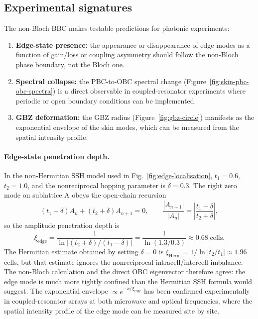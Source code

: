 \subsection{Experimental signatures}
\label{ssec:experimental-signatures}

The non-Bloch BBC makes testable predictions for photonic experiments:
\begin{enumerate}
 \item \textbf{Edge-state presence:} the appearance or disappearance
 of edge modes as a function of gain/loss or coupling asymmetry
 should follow the non-Bloch phase boundary, not the Bloch one.
 \item \textbf{Spectral collapse:} the PBC-to-OBC spectral change
 (Figure~\ref{fig:skin-pbc-obc-spectra}) is a direct observable
 in coupled-resonator experiments where periodic or open boundary
 conditions can be implemented.
 \item \textbf{GBZ deformation:} the GBZ radius
 (Figure~\ref{fig:gbz-circle}) manifests as the exponential
 envelope of the skin modes, which can be measured from the
 spatial intensity profile.
\end{enumerate}

\paragraph{Edge-state penetration depth.}
In the non-Hermitian SSH model used in Fig.~\ref{fig:edge-localisation},
$t_1 = 0.6$, $t_2 = 1.0$, and the nonreciprocal hopping parameter is
$\delta = 0.3$.  The right zero mode on sublattice A obeys the open-chain
recursion
\begin{equation}
  (t_1-\delta)A_n + (t_2+\delta)A_{n+1}=0,
  \qquad
  \frac{|A_{n+1}|}{|A_n|}=\left|\frac{t_1-\delta}{t_2+\delta}\right|,
  \label{eq:edge-recursion}
\end{equation}
so the amplitude penetration depth is
\begin{equation}
  \xi_{\mathrm{edge}}
  = \frac{1}{\ln\left|(t_2+\delta)/(t_1-\delta)\right|}
  = \frac{1}{\ln(1.3/0.3)}
  \approx 0.68\;\text{cells}.
  \label{eq:edge-penetration}
\end{equation}
The Hermitian estimate obtained by setting $\delta=0$ is
$\xi_{\mathrm{Herm}}=1/\ln|t_2/t_1|\approx1.96$ cells, but that estimate
ignores the nonreciprocal intracell/intercell imbalance.  The non-Bloch
calculation and the direct OBC eigenvector therefore agree: the edge mode
is much more tightly confined than the Hermitian SSH formula would
suggest.  The exponential envelope $\propto e^{-x/\xi_{\mathrm{edge}}}$
has been confirmed experimentally in coupled-resonator arrays at both
microwave and optical frequencies, where the spatial intensity profile of
the edge mode can be measured site by site.

